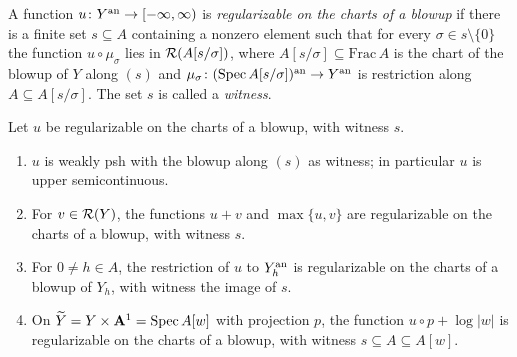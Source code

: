 \begin{definition}\label{def:nf-chart-regularizable}
\leanok
{}
A function $u\colon Y^{\mathrm{an}}\to[-\infty,\infty)$ is \emph{regularizable on the charts of a blowup} if there is a finite set
$s\subseteq A$ containing a nonzero element such that for every $\sigma\in s\setminus\{0\}$ the function
$u\circ\mu_\sigma$ lies in $\mathcal{R}(A[s/\sigma])$, where $A[s/\sigma]\subseteq\mathrm{Frac}\,A$ is the chart of the blowup
of $Y$ along $(s)$ and $\mu_\sigma\colon(\operatorname{Spec} A[s/\sigma])^{\mathrm{an}}\to Y^{\mathrm{an}}$ is restriction along $A\subseteq A[s/\sigma]$.
The set $s$ is called a \emph{witness}.
\end{definition}

\begin{lemma}\label{lem:nf-chart-regularizable-closure}
\leanok
{}
Let $u$ be regularizable on the charts of a blowup, with witness $s$.
\begin{enumerate}
\item $u$ is weakly psh with the blowup along $(s)$ as witness; in particular $u$ is upper semicontinuous.
\item For $v\in\mathcal{R}(Y)$, the functions $u+v$ and $\max\{u,v\}$ are regularizable on the charts of a blowup, with
witness $s$.
\item For $0\ne h\in A$, the restriction of $u$ to $Y_h^{\mathrm{an}}$ is regularizable on the charts of a blowup of $Y_h$,
with witness the image of $s$.
\item On $\widetilde Y=Y\times\mathbf{A}^1=\operatorname{Spec} A[w]$ with projection $p$, the function $u\circ p+\log|w|$ is regularizable on
the charts of a blowup, with witness $s\subseteq A\subseteq A[w]$.
\end{enumerate}
\end{lemma}

